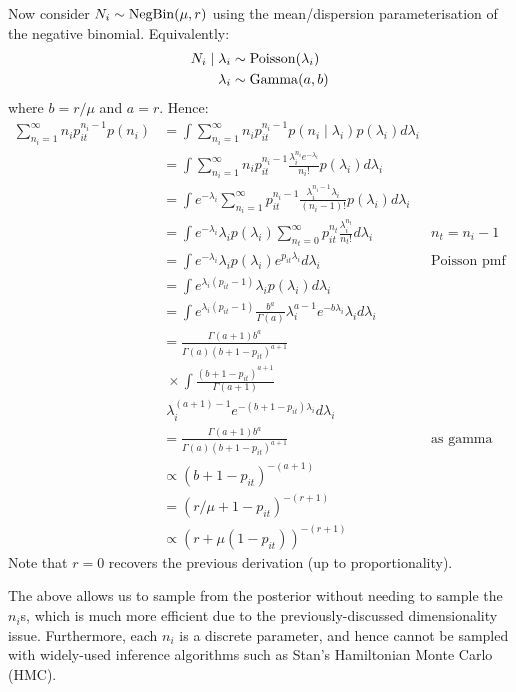 \documentclass[thesis.tex]{subfiles}
\begin{document}
Now consider $N_i \sim \operatorname{NegBin}(\mu, r)$ using the
mean/dispersion parameterisation of the negative binomial. Equivalently:
\begin{align}
N_i \mid \lambda_i &\sim \operatorname{Poisson}(\lambda_i) \\
\lambda_i &\sim \operatorname{Gamma}(a, b)
\end{align}
where $b = r / \mu$ and $a = r$.
Hence:
\begin{align}
\sum_{n_i=1}^\infty n_i p_{it}^{n_i- 1} p(n_i) 
&= \int \sum_{n_i=1}^\infty n_i p_{it}^{n_i- 1} p(n_i \mid \lambda_i) p(\lambda_i) d\lambda_i \\
&= \int \sum_{n_i=1}^\infty n_i p_{it}^{n_i- 1} \frac{\lambda_i^{n_i} e^{-\lambda_i}}{n_i!} p(\lambda_i) d\lambda_i \\
&= \int e^{-\lambda_i} \sum_{n_i=1}^\infty p_{it}^{n_i- 1} \frac{\lambda_i^{n_i-1}\lambda_i }{(n_i-1)!} p(\lambda_i) d\lambda_i \\
&= \int e^{-\lambda_i} \lambda_i p(\lambda_i) \sum_{n_t=0}^\infty p_{it}^{n_t} \frac{\lambda_i^{n_t} }{n_t!} d\lambda_i &n_t = n_i - 1 \\
&= \int e^{-\lambda_i} \lambda_i p(\lambda_i) e^{p_{it}\lambda_i} d\lambda_i &\text{Poisson pmf} \\
&= \int e^{\lambda_i (p_{it} - 1)} \lambda_i p(\lambda_i) d\lambda_i \\
&= \int e^{\lambda_i (p_{it} - 1)} \frac{b^a}{\Gamma(a)} \lambda_i^{a-1} e^{-b\lambda_i} \lambda_i d\lambda_i \\
&= \frac{\Gamma(a+1)b^a}{\Gamma(a) (b+1-p_{it})^{a+1}} \\ 
  &\; \times \int \frac{(b+1-p_{it})^{a+1}}{\Gamma(a+1)} \\
  &\; \lambda_i^{(a+1)-1} e^{-(b+1-p_{it})\lambda_i} d\lambda_i \\
&= \frac{\Gamma(a+1)b^a}{\Gamma(a) (b+1-p_{it})^{a+1}} &\text{as gamma pdf} \\
&\propto (b+1-p_{it})^{-(a+1)} \\
&= (r/\mu+1-p_{it})^{-(r+1)} \\
&\propto (r+\mu (1-p_{it}))^{-(r+1)}
\end{align}
Note that $r=0$ recovers the previous derivation (up to
proportionality).

The above allows us to sample from the posterior without needing to
sample the $n_i$s, which is much more efficient due to the previously-discussed dimensionality issue.
Furthermore, each $n_i$ is a discrete parameter, and hence
cannot be sampled with widely-used inference algorithms such as Stan's Hamiltonian Monte Carlo (HMC).
\end{document}
